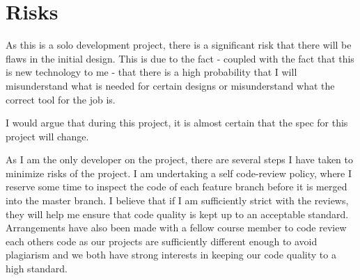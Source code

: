 \chapter{Risks}
As this is a solo development project, there is a significant risk that there will be flaws in the initial design. 
This is due to the fact - coupled with the fact that this is new technology to me - that there is a high probability that I will misunderstand what is needed for certain designs or misunderstand what the correct tool for the job is.

I would argue that during this project, it is almost certain that the spec for this project will change.

As I am the only developer on the project, there are several steps I have taken to minimize risks of the project.
I am undertaking a self code-review policy, where I reserve some time to inspect the code of each feature branch before it is merged into the master branch.
I believe that if I am sufficiently strict with the reviews, they will help me ensure that code quality is kept up to an acceptable standard.
Arrangements have also been made with a fellow course member to code review each others code as our projects are sufficiently different enough to avoid plagiarism and we both have strong interests in keeping our code quality to a high standard.